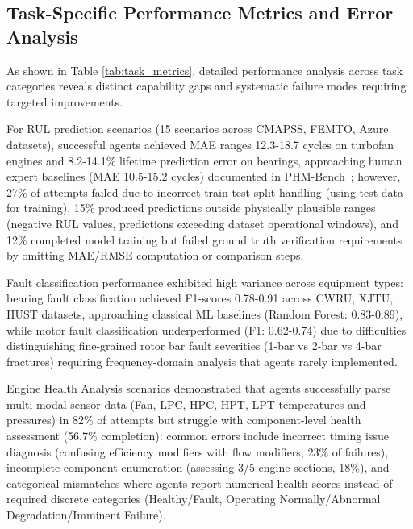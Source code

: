 \documentclass[sigconf,review]{acmart}
\begin{document}
  \subsection{Task-Specific Performance Metrics and Error Analysis}          
  As shown in Table \ref{tab:task_metrics}, detailed performance analysis across task categories reveals distinct capability gaps and systematic failure modes requiring targeted improvements. 
  
  For RUL prediction scenarios (15 scenarios across CMAPSS,    
  FEMTO, Azure datasets), successful agents achieved MAE ranges 12.3-18.7    
  cycles on turbofan engines and 8.2-14.1\% lifetime prediction error on     
  bearings, approaching human expert baselines (MAE 10.5-15.2 cycles)        
  documented in PHM-Bench~\cite{yang2025phmbenchdomainspecificbenchmarkingframework}; however, 27\% of attempts 
  failed due to incorrect train-test split handling (using test data for     
  training), 15\% produced predictions outside physically plausible ranges   
  (negative RUL values, predictions exceeding dataset operational windows),  
  and 12\% completed model training but failed ground truth verification     
  requirements by omitting MAE/RMSE computation or comparison steps. 
  
  Fault   
  classification performance exhibited high variance across equipment types: 
  bearing fault classification achieved F1-scores 0.78-0.91 across CWRU,     
  XJTU, HUST datasets, approaching classical ML baselines (Random Forest:    
  0.83-0.89), while motor fault classification underperformed (F1: 0.62-0.74)
   due to difficulties distinguishing fine-grained rotor bar fault severities
   (1-bar vs 2-bar vs 4-bar fractures) requiring frequency-domain analysis   
  that agents rarely implemented. 
  
  Engine Health Analysis scenarios demonstrated that agents successfully parse     
  multi-modal sensor data (Fan, LPC, HPC, HPT, LPT temperatures and          
  pressures) in 82\% of attempts but struggle with component-level health    
  assessment (56.7\% completion): common errors include incorrect timing     
  issue diagnosis (confusing efficiency modifiers with flow modifiers, 23\%  
  of failures), incomplete component enumeration (assessing 3/5 engine       
  sections, 18\%), and categorical mismatches where agents report numerical  
  health scores instead of required discrete categories (Healthy/Fault,      
  Operating Normally/Abnormal Degradation/Imminent Failure). 
  
\end{document}
